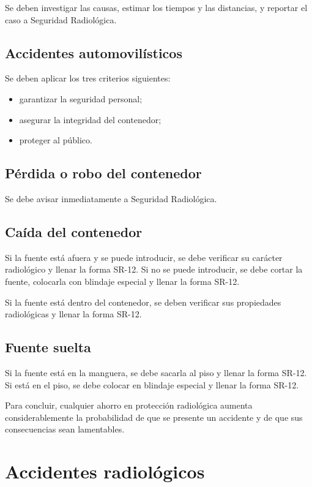 Se deben investigar las causas, estimar los tiempos y las distancias, y reportar el caso a Seguridad Radiológica.

\subsection{Accidentes automovilísticos}

Se deben aplicar los tres criterios siguientes:
\begin{itemize}
  \item garantizar la seguridad personal;
  \item asegurar la integridad del contenedor;
  \item proteger al público.
\end{itemize}

\subsection{Pérdida o robo del contenedor}

Se debe avisar inmediatamente a Seguridad Radiológica.

\subsection{Caída del contenedor}

Si la fuente está afuera y se puede introducir, se debe verificar su carácter radiológico y llenar la forma SR-12. Si no se puede introducir, se debe cortar la fuente, colocarla con blindaje especial y llenar la forma SR-12.

Si la fuente está dentro del contenedor, se deben verificar sus propiedades radiológicas y llenar la forma SR-12.

\subsection{Fuente suelta}

Si la fuente está en la manguera, se debe sacarla al piso y llenar la forma SR-12. Si está en el piso, se debe colocar en blindaje especial y llenar la forma SR-12.

Para concluir, cualquier ahorro en protección radiológica aumenta considerablemente la probabilidad de que se presente un accidente y de que sus consecuencias sean lamentables.

\section{Accidentes radiológicos}

